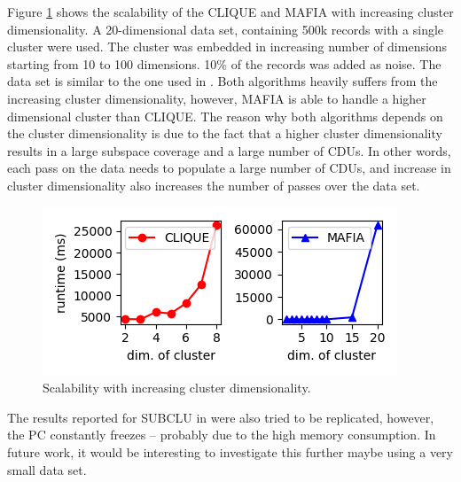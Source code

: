 Figure \ref{fig:cluster_dimensionality_vs_runtime} shows the scalability of the CLIQUE and MAFIA with increasing cluster dimensionality. A 20-dimensional data set, containing 500k records with a single cluster were used. The cluster was embedded in increasing number of dimensions starting from 10 to 100 dimensions. 10\% of the records was added as noise. The data set is similar to the one used in \cite{mafia}. Both algorithms heavily suffers from the increasing cluster dimensionality, however, MAFIA is able to handle a higher dimensional cluster than CLIQUE. The reason why both algorithms depends on the cluster dimensionality is due to the fact that a higher cluster dimensionality results in a large subspace coverage and a large number of CDUs. In other words, each pass on the data needs to populate a large number of CDUs, and increase in cluster dimensionality also increases the number of passes over the data set.
\begin{figure}[H]
    \vspace*{-0.7cm}
    \centering
    \includegraphics[scale=0.45]{figures/cluster_dimensionality_vs_runtime.png}
    \caption{Scalability with increasing cluster dimensionality.}
    \label{fig:cluster_dimensionality_vs_runtime}
    \vspace*{-0.7cm}
\end{figure}

The results reported for SUBCLU in \cite{subclu} were also tried to be replicated, however, the PC constantly freezes -- probably due to the high memory consumption. In future work, it would be interesting to investigate this further maybe using a very small data set.

